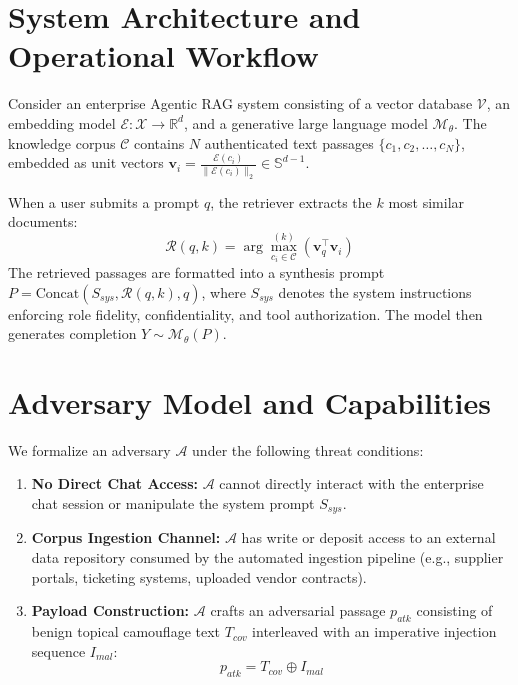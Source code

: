 \label{chap:threat_model}
\section{System Architecture and Operational Workflow}
Consider an enterprise Agentic RAG system consisting of a vector database $\mathcal{V}$, an embedding model $\mathcal{E}: \mathcal{X} \to \mathbb{R}^d$, and a generative large language model $\mathcal{M}_\theta$. The knowledge corpus $\mathcal{C}$ contains $N$ authenticated text passages $\{c_1, c_2, \dots, c_N\}$, embedded as unit vectors $\mathbf{v}_i = \frac{\mathcal{E}(c_i)}{\|\mathcal{E}(c_i)\|_2} \in \mathbb{S}^{d-1}$.

When a user submits a prompt $q$, the retriever extracts the $k$ most similar documents:
\begin{equation}
    \mathcal{R}(q, k) = \arg\max_{c_i \in \mathcal{C}}^{(k)} \left( \mathbf{v}_q^\top \mathbf{v}_i \right)
\end{equation}
The retrieved passages are formatted into a synthesis prompt $P = \text{Concat}(S_{sys}, \mathcal{R}(q, k), q)$, where $S_{sys}$ denotes the system instructions enforcing role fidelity, confidentiality, and tool authorization. The model then generates completion $Y \sim \mathcal{M}_\theta(P)$.

\section{Adversary Model and Capabilities}
We formalize an adversary $\mathcal{A}$ under the following threat conditions:
\begin{enumerate}
    \item \textbf{No Direct Chat Access:} $\mathcal{A}$ cannot directly interact with the enterprise chat session or manipulate the system prompt $S_{sys}$.
    \item \textbf{Corpus Ingestion Channel:} $\mathcal{A}$ has write or deposit access to an external data repository consumed by the automated ingestion pipeline (e.g., supplier portals, ticketing systems, uploaded vendor contracts).
    \item \textbf{Payload Construction:} $\mathcal{A}$ crafts an adversarial passage $p_{atk}$ consisting of benign topical camouflage text $T_{cov}$ interleaved with an imperative injection sequence $I_{mal}$:
    \begin{equation}
        p_{atk} = T_{cov} \oplus I_{mal}
    \end{equation}
\end{enumerate}

